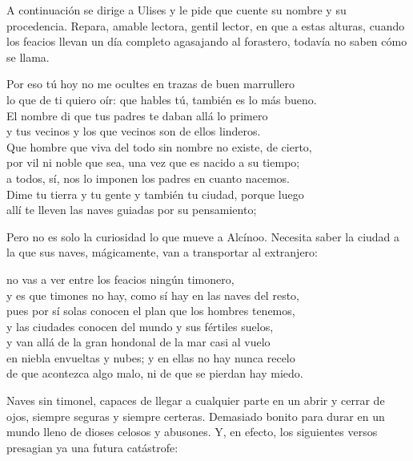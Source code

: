 A continuación se dirige a Ulises y le pide que cuente su nombre y su procedencia. Repara, amable lectora, gentil lector, en que a estas alturas, cuando los feacios llevan un día completo agasajando al forastero, todavía no saben cómo se llama.

\begin{versocita}
Por eso tú hoy no me ocultes en trazas de buen marrullero\\
lo que de ti quiero oír: que hables tú, también es lo más bueno.\\
El nombre di que tus padres te daban allá lo primero\\
y tus vecinos y los que vecinos son de ellos linderos.\\
Que hombre que viva del todo sin nombre no existe, de cierto,\\
por vil ni noble que sea, una vez que es nacido a su tiempo;\\
a todos, sí, nos lo imponen los padres en cuanto nacemos.\\
Dime tu tierra y tu gente y también tu ciudad, porque luego\\
allí te lleven las naves guiadas por su pensamiento;
\end{versocita}

Pero no es solo la curiosidad lo que mueve a Alcínoo. Necesita saber la ciudad a la que sus naves, mágicamente, van a transportar al extranjero:

\begin{versocita}
no vas a ver entre los feacios ningún timonero,\\
y es que timones no hay, como sí hay en las naves del resto,\\
pues por sí solas conocen el plan que los hombres tenemos,\\
y las ciudades conocen del mundo y sus fértiles suelos,\\
y van allá de la gran hondonal de la mar casi al vuelo\\
en niebla envueltas y nubes; y en ellas no hay nunca recelo\\
de que acontezca algo malo, ni de que se pierdan hay miedo.
\end{versocita}

Naves sin timonel, capaces de llegar a cualquier parte en un abrir y cerrar de ojos, siempre seguras y siempre certeras. Demasiado bonito para durar en un mundo lleno de dioses celosos y abusones. Y, en efecto, los siguientes versos presagian ya una futura catástrofe:

